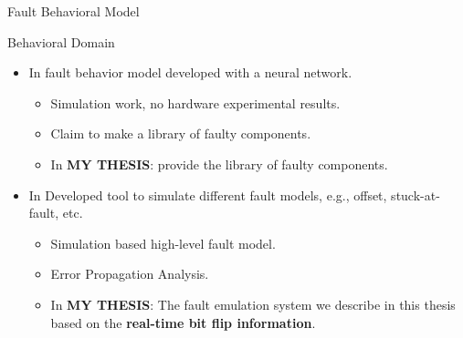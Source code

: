 \documentclass[aspectratio=1610]{beamer}
\begin{document}
\begin{frame}{Fault Behavioral Model}

\begin{block}{Behavioral  Domain}
\end{block}
\begin{itemize}
\item In \citep{mirzadeh2014modeling} fault behavior model developed with a neural network.  
\begin{itemize}
\item Simulation work, no hardware experimental results.
\item Claim to make a library of faulty components.
\item In \textbf{MY THESIS}: provide the library of faulty components.

\end{itemize}



\item In \citep{janschek2017errorsim} Developed tool to simulate different fault models, e.g., offset, stuck-at-fault, etc.



\begin{itemize}


\item Simulation based high-level fault model.
\item Error Propagation Analysis.


\item In \textbf{MY THESIS}: The fault emulation system we describe in this thesis based on the \textbf{real-time bit flip information}. 
\end{itemize} 
\end{itemize}







\end{frame}
\end{document}
